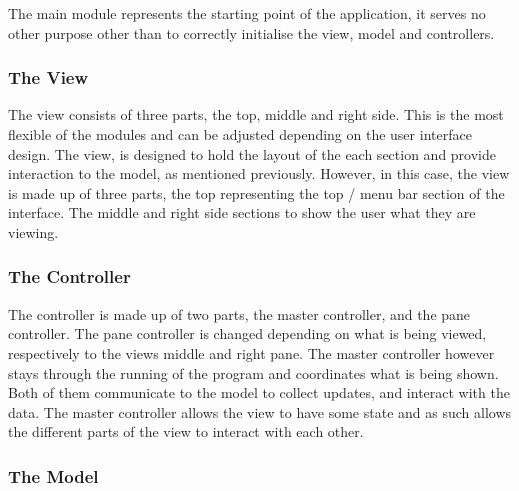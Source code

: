 The main module represents the starting point of the application, it serves no other purpose other than to correctly initialise the view, model and controllers.

\subsubsection{The View}
\label{subsubsec:the_view}

The view consists of three parts, the top, middle and right side. This is the most flexible of the modules and can be adjusted depending on the user interface design. The view, is designed to hold the layout of the each section and provide interaction to the model, as mentioned previously. However, in this case, the view is made up of three parts, the top representing the top / menu bar section of the interface. The middle and right side sections to show the user what they are viewing.

\subsubsection{The Controller}
\label{subsubsec:the_controller}

The controller is made up of two parts, the master controller, and the pane controller. The pane controller is changed depending on what is being viewed, respectively to the views middle and right pane. The master controller however stays through the running of the program and coordinates what is being shown. Both of them communicate to the model to collect updates, and interact with the data. The master controller allows the view to have some state and as such allows the different parts of the view to interact with each other.

\subsubsection{The Model}
\label{subsubsec:the_model}

